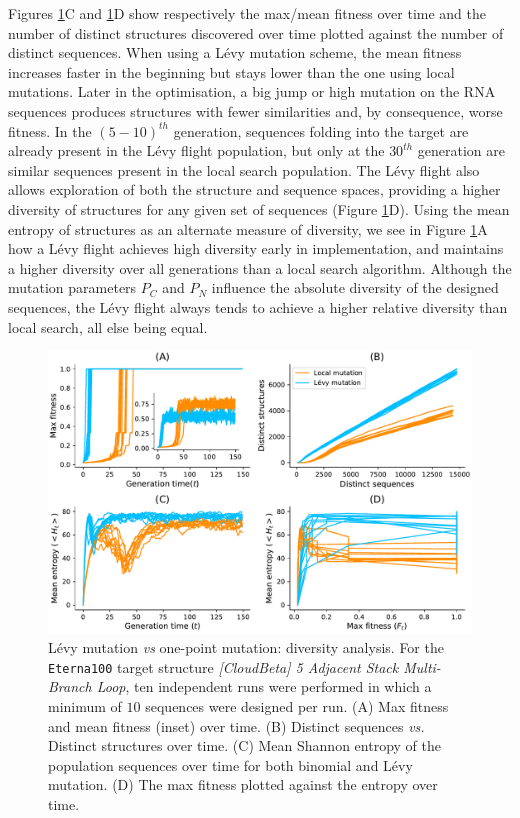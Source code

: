 Figures  \ref{Fig:diversity}C and  \ref{Fig:diversity}D show respectively the max/mean fitness over time and the number of distinct structures discovered over time plotted against the number of distinct sequences. When using a Lévy mutation scheme, the mean fitness increases faster in the beginning but stays lower than the one using local mutations. Later in the optimisation, a big jump or high mutation on the RNA sequences produces structures with fewer similarities and, by consequence, worse fitness. In the $(5-10)^{th}$ generation, sequences folding into the target are already present in the Lévy flight population, but only at the $30^{th}$ generation are similar sequences present in the local search population. The Lévy flight also allows exploration of both the structure and sequence spaces, providing a higher diversity of structures for any given set of sequences (Figure \ref{Fig:diversity}D). Using the mean entropy of structures as an alternate measure of diversity, we see in Figure \ref{Fig:diversity}A how a Lévy flight achieves high diversity early in implementation, and maintains a higher diversity over all generations than a local search algorithm. Although the mutation parameters $P_C$ and $P_N$ influence the absolute diversity of the designed sequences, the Lévy flight always tends to achieve a higher relative diversity than local search, all else being equal. 

\begin{figure}[t!]
	\centering
	\includegraphics[width=1.0\linewidth]{../res/images/arnaque/fig8.pdf}
	\small 
	\caption{Lévy mutation \emph{vs} one-point mutation: diversity analysis. For the \texttt{Eterna100} target structure \textit{[CloudBeta] 5 Adjacent Stack Multi-Branch Loop}, ten independent runs were performed in which a minimum of $10$ sequences were designed per run.  (A) Max fitness and mean fitness (inset) over time. (B) Distinct sequences \emph{vs.} Distinct structures over time. (C) Mean Shannon entropy of the population sequences over time for both binomial and Lévy mutation. (D) The max fitness plotted against the entropy over time.}
	\label{Fig:diversity}
	
\end{figure}


